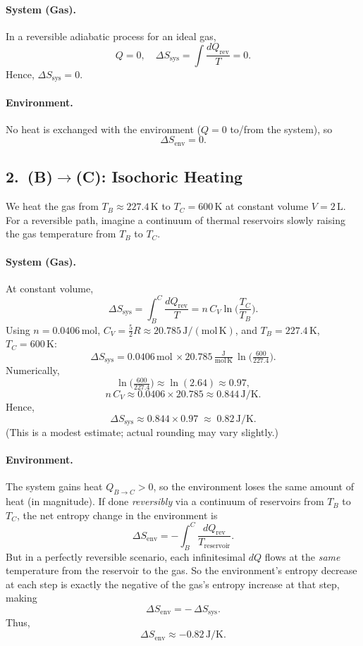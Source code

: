 \documentclass[12pt]{article}
\theoremstyle{definition} %
\theoremstyle{plain} %
\begin{document}
\paragraph{System (Gas).}  
In a reversible adiabatic process for an ideal gas, 
\[
Q=0, 
\quad
\Delta S_{\mathrm{sys}} = \int \frac{dQ_{\mathrm{rev}}}{T} = 0.
\]
Hence, \(\Delta S_{\mathrm{sys}}=0.\)

\paragraph{Environment.}  
No heat is exchanged with the environment (\(Q=0\) to/from the system), so 
\[
\Delta S_{\mathrm{env}}=0.
\]

\subsection*{2.\ (B)\(\to\)(C): Isochoric Heating}

We heat the gas from \(T_B\approx 227.4\,\mathrm{K}\) to \(T_C=600\,\mathrm{K}\) at constant volume \(V=2\,\mathrm{L}\). For a reversible path, imagine a continuum of thermal reservoirs slowly raising the gas temperature from \(T_B\) to \(T_C\).

\paragraph{System (Gas).}  
At constant volume,
\[
\Delta S_{\mathrm{sys}} 
= \int_B^C \frac{dQ_{\mathrm{rev}}}{T} 
= n\,C_V \ln\!\biggl(\frac{T_C}{T_B}\biggr).
\]
Using \(n=0.0406\,\mathrm{mol}\), \(C_V=\tfrac{5}{2}R \approx 20.785\,\mathrm{J/(mol\,K)}\), and \(T_B=227.4\,\mathrm{K}\), \(T_C=600\,\mathrm{K}\):
\[
\Delta S_{\mathrm{sys}}
= 0.0406 \,\mathrm{mol}\,\times 20.785 \,\mathrm{\tfrac{J}{mol\,K}}
  \,\ln\!\bigl(\tfrac{600}{227.4}\bigr).
\]
Numerically,
\[
\ln\!\bigl(\tfrac{600}{227.4}\bigr) \approx \ln(2.64) \approx 0.97,
\]
\[
n\,C_V \approx 0.0406 \times 20.785 \approx 0.844\,\mathrm{J/K}.
\]
Hence,
\[
\Delta S_{\mathrm{sys}} \approx 0.844 \times 0.97 \;\approx\; 0.82\,\mathrm{J/K}.
\]
(This is a modest estimate; actual rounding may vary slightly.)

\paragraph{Environment.}  
The system gains heat \(Q_{B\to C}>0\), so the environment loses the same amount of heat (in magnitude).  If done \emph{reversibly} via a continuum of reservoirs from \(T_B\) to \(T_C\), the net entropy change in the environment is
\[
\Delta S_{\mathrm{env}} 
= - \int_B^C \frac{dQ_{\mathrm{rev}}}{T_{\mathrm{reservoir}}}.
\]
But in a perfectly reversible scenario, each infinitesimal \(dQ\) flows at the \emph{same} temperature from the reservoir to the gas.  So the environment’s entropy decrease at each step is exactly the negative of the gas’s entropy increase at that step, making
\[
\Delta S_{\mathrm{env}} = -\,\Delta S_{\mathrm{sys}}.
\]
Thus,
\[
\Delta S_{\mathrm{env}} \approx -0.82\,\mathrm{J/K}.
\]
\end{document}
